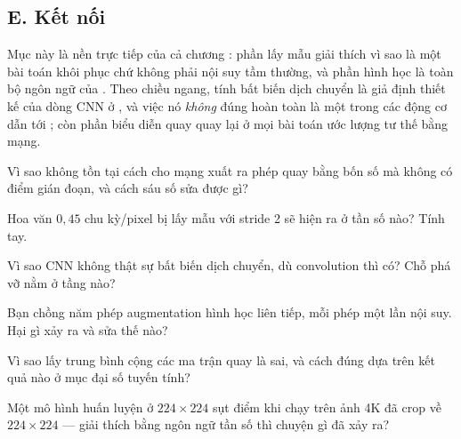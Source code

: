 \documentclass[../../../deep_learning.tex]{subfiles}
\begin{document}
\subsection{E. Kết nối}
Mục này là nền trực tiếp của cả chương : phần lấy mẫu giải thích vì sao  là một bài toán khôi phục chứ không phải nội suy tầm thường, và phần hình học là toàn bộ ngôn ngữ của . Theo chiều ngang, tính bất biến dịch chuyển là giả định thiết kế của dòng CNN ở , và việc nó \emph{không} đúng hoàn toàn là một trong các động cơ dẫn tới ; còn phần biểu diễn quay quay lại ở mọi bài toán ước lượng tư thế bằng mạng.

\begin{tukiem}
\item Vì sao không tồn tại cách cho mạng xuất ra phép quay bằng bốn số mà không có điểm gián đoạn, và cách sáu số sửa được gì?
\item Hoa văn \(0{,}45\) chu kỳ/pixel bị lấy mẫu với stride 2 sẽ hiện ra ở tần số nào? Tính tay.
\item Vì sao CNN không thật sự bất biến dịch chuyển, dù convolution thì có? Chỗ phá vỡ nằm ở tầng nào?
\item Bạn chồng năm phép augmentation hình học liên tiếp, mỗi phép một lần nội suy. Hại gì xảy ra và sửa thế nào?
\item Vì sao lấy trung bình cộng các ma trận quay là sai, và cách đúng dựa trên kết quả nào ở mục đại số tuyến tính?
\item Một mô hình huấn luyện ở \(224\times224\) sụt điểm khi chạy trên ảnh 4K đã crop về \(224\times224\) --- giải thích bằng ngôn ngữ tần số thì chuyện gì đã xảy ra?
\end{tukiem}
\ifSubfilesClassLoaded{\printbibliography[title={Nguồn}]}{}
\end{document}

